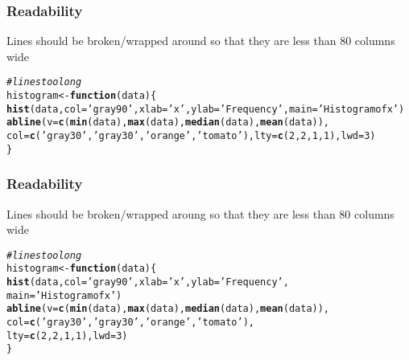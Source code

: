 \documentclass[12pt]{beamer}\usepackage[]{graphicx}\usepackage[]{color}
\makeatletter
\newcommand{\hlnum}[1]{\textcolor[rgb]{0.686,0.059,0.569}{#1}}%
\newcommand{\hlstr}[1]{\textcolor[rgb]{0.192,0.494,0.8}{#1}}%
\newcommand{\hlcom}[1]{\textcolor[rgb]{0.678,0.584,0.686}{\textit{#1}}}%
\newcommand{\hlstd}[1]{\textcolor[rgb]{0.345,0.345,0.345}{#1}}%
\newcommand{\hlkwa}[1]{\textcolor[rgb]{0.161,0.373,0.58}{\textbf{#1}}}%
\newcommand{\hlkwb}[1]{\textcolor[rgb]{0.69,0.353,0.396}{#1}}%
\newcommand{\hlkwc}[1]{\textcolor[rgb]{0.333,0.667,0.333}{#1}}%
\newcommand{\hlkwd}[1]{\textcolor[rgb]{0.737,0.353,0.396}{\textbf{#1}}}%
\newenvironment{kframe}{%
 \def\at@end@of@kframe{}%
 \ifinner\ifhmode%
  \def\at@end@of@kframe{\end{minipage}}%
  \begin{minipage}{\columnwidth}%
 \fi\fi%
 \def\FrameCommand##1{\hskip\@totalleftmargin \hskip-\fboxsep
 \colorbox{shadecolor}{##1}\hskip-\fboxsep
     \hskip-\linewidth \hskip-\@totalleftmargin \hskip\columnwidth}%
 \MakeFramed {\advance\hsize-\width
   \@totalleftmargin\z@ \linewidth\hsize
   \@setminipage}}%
 {\par\unskip\endMakeFramed%
 \at@end@of@kframe}
\newenvironment{knitrout}{}{} %
\makeatother
\begin{document}

\begin{frame}[fragile]
\frametitle{Readability}

Lines should be broken/wrapped around so that they are less than 80 columns wide
\begin{knitrout}\scriptsize
{}\color{fgcolor}\begin{kframe}
\begin{alltt}
\hlcom{# lines too long}
\hlstd{histogram} \hlkwb{<-} \hlkwa{function}\hlstd{(}\hlkwc{data}\hlstd{)\{}
\hlkwd{hist}\hlstd{(data,} \hlkwc{col} \hlstd{=} \hlstr{'gray90'}\hlstd{,} \hlkwc{xlab} \hlstd{=} \hlstr{'x'}\hlstd{,} \hlkwc{ylab} \hlstd{=} \hlstr{'Frequency'}\hlstd{,} \hlkwc{main}\hlstd{=} \hlstr{'Histogram of x'}\hlstd{)}
\hlkwd{abline}\hlstd{(}\hlkwc{v} \hlstd{=} \hlkwd{c}\hlstd{(}\hlkwd{min}\hlstd{(data),} \hlkwd{max}\hlstd{(data),} \hlkwd{median}\hlstd{(data),} \hlkwd{mean}\hlstd{(data)),}
\hlkwc{col} \hlstd{=} \hlkwd{c}\hlstd{(}\hlstr{'gray30'}\hlstd{,} \hlstr{'gray30'}\hlstd{,} \hlstr{'orange'}\hlstd{,} \hlstr{'tomato'}\hlstd{),} \hlkwc{lty} \hlstd{=} \hlkwd{c}\hlstd{(}\hlnum{2}\hlstd{,}\hlnum{2}\hlstd{,}\hlnum{1}\hlstd{,}\hlnum{1}\hlstd{),} \hlkwc{lwd} \hlstd{=} \hlnum{3}\hlstd{)}
\hlstd{\}}
\end{alltt}
\end{kframe}
\end{knitrout}

\end{frame}


\begin{frame}[fragile]
\frametitle{Readability}

Lines should be broken/wrapped aroung so that they are less than 80 columns wide
\begin{knitrout}\scriptsize
{}\color{fgcolor}\begin{kframe}
\begin{alltt}
\hlcom{# lines too long}
\hlstd{histogram} \hlkwb{<-} \hlkwa{function}\hlstd{(}\hlkwc{data}\hlstd{) \{}
  \hlkwd{hist}\hlstd{(data,} \hlkwc{col} \hlstd{=} \hlstr{'gray90'}\hlstd{,} \hlkwc{xlab} \hlstd{=} \hlstr{'x'}\hlstd{,} \hlkwc{ylab} \hlstd{=} \hlstr{'Frequency'}\hlstd{,}
       \hlkwc{main} \hlstd{=} \hlstr{'Histogram of x'}\hlstd{)}
  \hlkwd{abline}\hlstd{(}\hlkwc{v} \hlstd{=} \hlkwd{c}\hlstd{(}\hlkwd{min}\hlstd{(data),} \hlkwd{max}\hlstd{(data),} \hlkwd{median}\hlstd{(data),} \hlkwd{mean}\hlstd{(data)),}
         \hlkwc{col} \hlstd{=} \hlkwd{c}\hlstd{(}\hlstr{'gray30'}\hlstd{,} \hlstr{'gray30'}\hlstd{,} \hlstr{'orange'}\hlstd{,} \hlstr{'tomato'}\hlstd{),}
         \hlkwc{lty} \hlstd{=} \hlkwd{c}\hlstd{(}\hlnum{2}\hlstd{,}\hlnum{2}\hlstd{,}\hlnum{1}\hlstd{,}\hlnum{1}\hlstd{),} \hlkwc{lwd} \hlstd{=} \hlnum{3}\hlstd{)}
\hlstd{\}}
\end{alltt}
\end{kframe}
\end{knitrout}

\end{frame}
\end{document}
